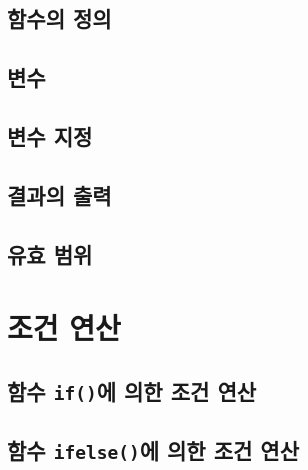 \documentclass[
]{book}
\begin{document}
\hypertarget{uxd568uxc218uxc758-uxc815uxc758}{%
\subsection{함수의 정의}\label{uxd568uxc218uxc758-uxc815uxc758}}

\hypertarget{uxbcc0uxc218}{%
\subsection{변수}\label{uxbcc0uxc218}}

\hypertarget{uxbcc0uxc218-uxc9c0uxc815}{%
\subsection{변수 지정}\label{uxbcc0uxc218-uxc9c0uxc815}}

\hypertarget{uxacb0uxacfcuxc758-uxcd9cuxb825}{%
\subsection{결과의 출력}\label{uxacb0uxacfcuxc758-uxcd9cuxb825}}

\hypertarget{uxc720uxd6a8-uxbc94uxc704}{%
\subsection{유효 범위}\label{uxc720uxd6a8-uxbc94uxc704}}

\hypertarget{uxc870uxac74-uxc5f0uxc0b0}{%
\section{조건 연산}\label{uxc870uxac74-uxc5f0uxc0b0}}

\hypertarget{uxd568uxc218-ifuxc5d0-uxc758uxd55c-uxc870uxac74-uxc5f0uxc0b0}{%
\subsection{\texorpdfstring{함수 \texttt{if()}에 의한 조건 연산}{함수 if()에 의한 조건 연산}}\label{uxd568uxc218-ifuxc5d0-uxc758uxd55c-uxc870uxac74-uxc5f0uxc0b0}}

\hypertarget{uxd568uxc218-ifelseuxc5d0-uxc758uxd55c-uxc870uxac74-uxc5f0uxc0b0}{%
\subsection{\texorpdfstring{함수 \texttt{ifelse()}에 의한 조건 연산}{함수 ifelse()에 의한 조건 연산}}\label{uxd568uxc218-ifelseuxc5d0-uxc758uxd55c-uxc870uxac74-uxc5f0uxc0b0}}
\end{document}
